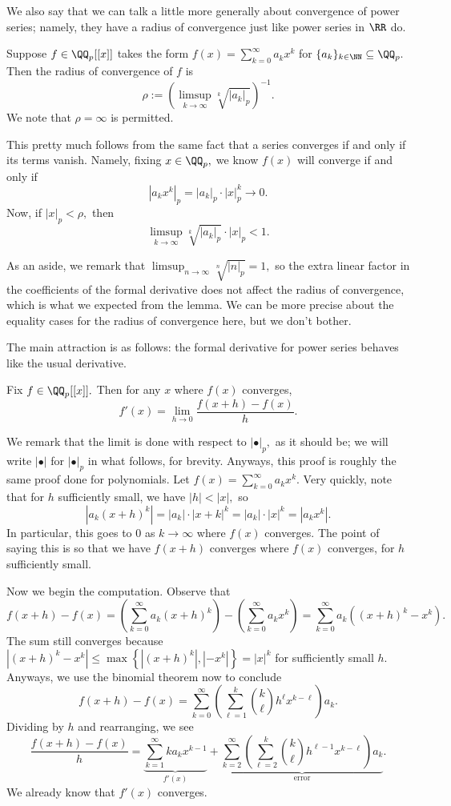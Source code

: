 We also say that we can talk a little more generally about convergence of power series; namely, they have a radius of convergence just like power series in $\RR$ do.
\begin{proposition}
    Suppose $f\in\QQ_p[[x]]$ takes the form $f(x)=\sum_{k=0}^\infty a_kx^k$ for $\{a_k\}_{k\in\NN}\subseteq\QQ_p.$ Then the radius of convergence of $f$ is
    \[\rho:=\left(\limsup_{k\to\infty}\sqrt[k]{|a_k|_p}\right)^{-1}.\]
    We note that $\rho=\infty$ is permitted.
\end{proposition}
This pretty much follows from the same fact that a series converges if and only if its terms vanish. Namely, fixing $x\in\QQ_p,$ we know $f(x)$ will converge if and only if
\[\left|a_kx^k\right|_p=|a_k|_p\cdot|x|_p^k\to0.\]
Now, if $|x|_p<\rho,$ then
\[\limsup_{k\to\infty}\sqrt[k]{|a_k|_p}\cdot|x|_p<1.\]

As an aside, we remark that $\limsup_{n\to\infty}\sqrt[n]{|n|_p}=1,$ so the extra linear factor in the coefficients of the formal derivative does not affect the radius of convergence, which is what we expected from the lemma. We can be more precise about the equality cases for the radius of convergence here, but we don't bother.

The main attraction is as follows: the formal derivative for power series behaves like the
usual derivative.
\begin{proposition}
    Fix $f\in\QQ_p[[x]].$ Then for any $x$ where $f(x)$ converges,
    \[f'(x)=\lim_{h\to0}\frac{f(x+h)-f(x)}h.\]
\end{proposition}
We remark that the limit is done with respect to $|\bullet|_p,$ as it should be; we will write $|\bullet|$ for $|\bullet|_p$ in what follows, for brevity. Anyways, this proof is roughly the same proof done for polynomials. Let $f(x)=\sum_{k=0}^\infty a_kx^k.$ Very quickly, note that for $h$ sufficiently small, we have $|h|<|x|,$ so
\[\left|a_k\left(x+h\right)^k\right|=|a_k|\cdot\left|x+k\right|^k=|a_k|\cdot|x|^k=\left|a_kx^k\right|.\]
In particular, this goes to $0$ as $k\to\infty$ where $f(x)$ converges. The point of saying this is so that we have $f(x+h)$ converges where $f(x)$ converges, for $h$ sufficiently small.

Now we begin the computation. Observe that
\[f(x+h)-f(x)=\left(\sum_{k=0}^\infty a_k(x+h)^k\right)-\left(\sum_{k=0}^\infty a_kx^k\right)=\sum_{k=0}^\infty a_k\left((x+h)^k-x^k\right).\]
The sum still converges because $\left|(x+h)^k-x^k\right|\le\max\left\{\left|(x+h)^k\right|,\left|-x^k\right|\right\}=|x|^k$ for sufficiently small $h.$ Anyways, we use the binomial theorem now to conclude
\[f(x+h)-f(x)=\sum_{k=0}^\infty\left(\sum_{\ell=1}^k\binom k\ell h^\ell x^{k-\ell}\right)a_k.\]
Dividing by $h$ and rearranging, we see
\[\frac{f(x+h)-f(x)}h=\underbrace{\sum_{k=1}^\infty ka_kx^{k-1}}_{f'(x)}+\underbrace{\sum_{k=2}^\infty\left(\sum_{\ell=2}^k\binom k\ell h^{\ell-1}x^{k-\ell}\right)a_k}_{\text{error}}.\]
We already know that $f'(x)$ converges.

